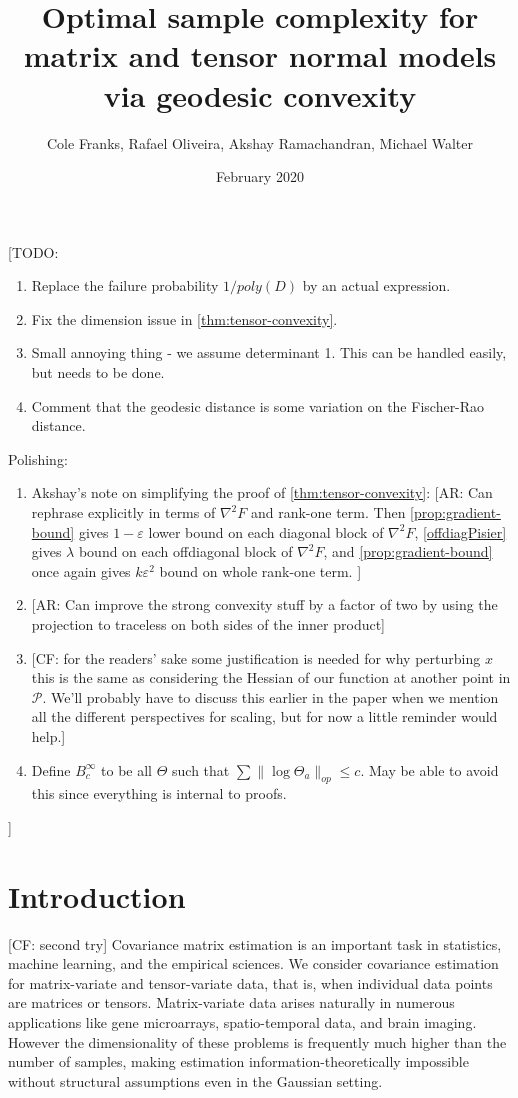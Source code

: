 \documentclass{article}
\title{Optimal sample complexity for matrix and tensor normal models via geodesic convexity}
\author{Cole Franks, Rafael Oliveira, Akshay Ramachandran, Michael Walter}
\date{February 2020}
\newcommand\eps{\varepsilon}
\newcommand\SPD{\mathcal{P}}
\newcommand\samp{x}
\newcommand{\CF}[1]{{\color{purple}[CF: #1]}}
\newcommand{\AR}[1]{{\color{orange}[AR: #1]}}
\newcommand{\TODO}[1]{{\color{blue}[TODO: #1]}}
\begin{document}
\maketitle
\tableofcontents
\TODO{
\begin{enumerate}
\item Replace the failure probability $1/poly(D)$ by an actual expression.
\item Fix the dimension issue in \cref{thm:tensor-convexity}.
\item Small annoying thing - we assume determinant 1. This can be handled easily, but needs to be done.
\item Comment that the geodesic distance is some variation on the Fischer-Rao distance.
\end{enumerate}
Polishing:
\begin{enumerate}
\item Akshay's note on simplifying the proof of \cref{thm:tensor-convexity}: \AR{Can rephrase explicitly in terms of $\nabla^{2} F$ and rank-one term. Then \ref{prop:gradient-bound} gives $1-\eps$ lower bound on each diagonal block of $\nabla^{2} F$, \ref{offdiagPisier} gives $\lambda$ bound on each offdiagonal block of $\nabla^{2} F$, and \ref{prop:gradient-bound} once again gives $k \eps^{2}$ bound on whole rank-one term.  }
\item \AR{Can improve the strong convexity stuff by a factor of two by using the projection to traceless on both sides of the inner product}
\item \CF{for the readers' sake some justification is needed for why perturbing $\samp$ this is the same as considering the Hessian of our function at another point in $\SPD$. We'll probably have to discuss this earlier in the paper when we mention all the different perspectives for scaling, but for now a little reminder would help.}
\item Define $B^\infty_c$ to be all $\Theta$ such that $\sum \|\log \Theta_a\|_{op} \leq c$. May be able to avoid this since everything is internal to proofs.
\end{enumerate}

}


\section{Introduction}
\CF{second try}
Covariance matrix estimation is an important task in statistics, machine learning, and the empirical sciences. We consider covariance estimation for matrix-variate and tensor-variate data, that is, when individual data points are matrices or tensors. Matrix-variate data arises naturally in numerous applications like gene microarrays, spatio-temporal data, and brain imaging. However the dimensionality of these problems is frequently much higher than the number of samples, making estimation information-theoretically impossible without structural assumptions even in the Gaussian setting. 
\end{document}
